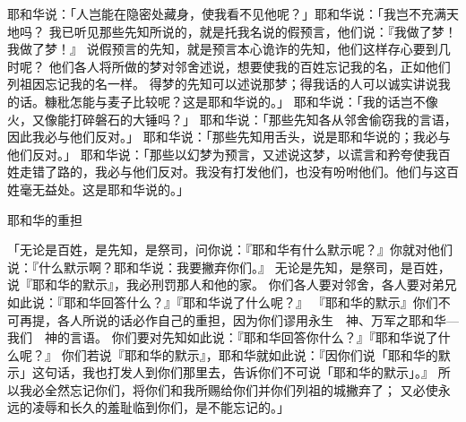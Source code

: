 {耶和华说：「人岂能在隐密处藏身，使我看不见他呢？」耶和华说：「我岂不充满天地吗？
我已听见那些先知所说的，就是托我名说的假预言，他们说：『我做了梦！我做了梦！』
说假预言的先知，就是预言本心诡诈的先知，他们这样存心要到几时呢？
他们各人将所做的梦对邻舍述说，想要使我的百姓忘记我的名，正如他们列祖因{}忘记我的名一样。
得梦的先知可以述说那梦；得我话的人可以诚实讲说我的话。糠秕怎能与麦子比较呢？这是耶和华说的。」
耶和华说：「我的话岂不像火，又像能打碎磐石的大锤吗？」
耶和华说：「那些先知各从邻舍偷窃我的言语，因此我必与他们反对。」
耶和华说：「那些先知用舌头，说是耶和华说的；我必与他们反对。」
耶和华说：「那些以幻梦为预言，又述说这梦，以谎言和矜夸使我百姓走错了路的，我必与他们反对。我没有打发他们，也没有吩咐他们。他们与这百姓毫无益处。这是耶和华说的。」
\par }{\SH 耶和华的重担
\par }{\PP {}「无论是百姓，是先知，是祭司，问你说：『耶和华有什么默示呢？』你就对他们说：『什么默示啊？耶和华说：我要撇弃你们。』
无论是先知，是祭司，是百姓，说『耶和华的默示』，我必刑罚那人和他的家。
你们各人要对邻舍，各人要对弟兄如此说：『耶和华回答什么？』『耶和华说了什么呢？』
『耶和华的默示』你们不可再提，各人所说的话必作自己的重担，因为你们谬用永生　神、万军之耶和华—我们　神的言语。
你们要对先知如此说：『耶和华回答你什么？』『耶和华说了什么呢？』
你们若说『耶和华的默示』，耶和华就如此说：『因你们说「耶和华的默示」这句话，我也打发人到你们那里去，告诉你们不可说「耶和华的默示」。』
所以我必全然忘记你们，将你们和我所赐给你们并你们列祖的城撇弃了；
又必使永远的凌辱和长久的羞耻临到你们，是不能忘记的。」

\par }
